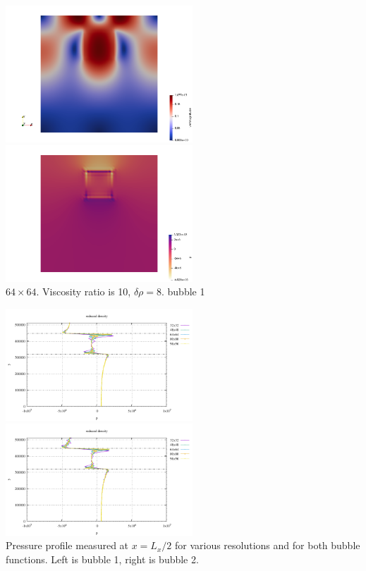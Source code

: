 \begin{center}
\includegraphics[width=7cm]{python_codes/fieldstone_72/results/block/reduced/vel}
\includegraphics[width=7cm]{python_codes/fieldstone_72/results/block/reduced/p}\\
{\captionfont $64\times 64$. Viscosity ratio is 10, $\delta \rho=8$. bubble 1}
\end{center}

\begin{center}
\includegraphics[width=7cm]{python_codes/fieldstone_72/results/block/reduced/plines_b1}
\includegraphics[width=7cm]{python_codes/fieldstone_72/results/block/reduced/plines_b2}\\
{\captionfont Pressure profile measured at $x=L_x/2$ for various resolutions and for both bubble functions.
Left is bubble 1, right is bubble 2.}
\end{center}

